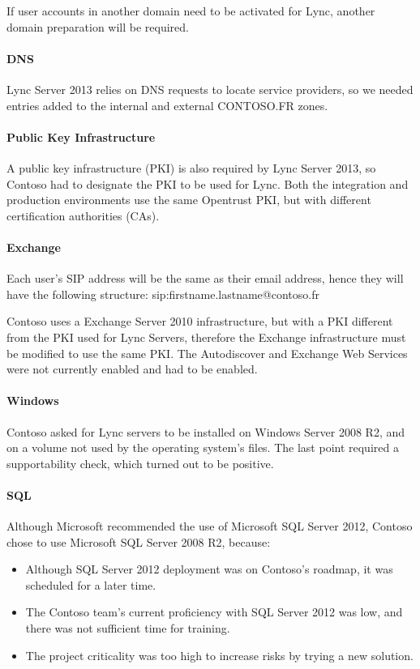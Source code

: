 	If user accounts in another domain need to be activated for Lync, another domain preparation will be required.

	\paragraph{DNS}
	Lync Server 2013 relies on DNS requests to locate service providers, so we needed entries added to the internal and external CONTOSO.FR zones.

	\paragraph{Public Key Infrastructure}
	A public key infrastructure (PKI) is also required by Lync Server 2013, so Contoso had to designate the PKI to be used for Lync. Both the integration and production environments use the same Opentrust\cite{_opentrust_????} PKI, but with different certification authorities (CAs).

	\paragraph{Exchange}
	Each user's SIP address will be the same as their email address, hence they will have the following structure: sip:firstname.lastname@contoso.fr

	Contoso uses a Exchange Server 2010 infrastructure, but with a PKI different from the PKI used for Lync Servers, therefore the Exchange infrastructure must be modified to use the same PKI.
	The Autodiscover and Exchange Web Services were not currently enabled and had to be enabled.

	\paragraph{Windows}
	Contoso asked for Lync servers to be installed on Windows Server 2008 R2, and on a volume not used by the operating system's files. The last point required a supportability check, which turned out to be positive.

	\paragraph{SQL}
	Although Microsoft recommended the use of Microsoft SQL Server 2012, Contoso chose to use Microsoft SQL Server 2008 R2, because:
	\begin{itemize}
	\item Although SQL Server 2012 deployment was on Contoso's roadmap, it was scheduled for a later time.
	\item The Contoso team's current proficiency with SQL Server 2012 was low, and there was not sufficient time for training.
	\item The project criticality was too high to increase risks by trying a new solution.
	\end{itemize}



